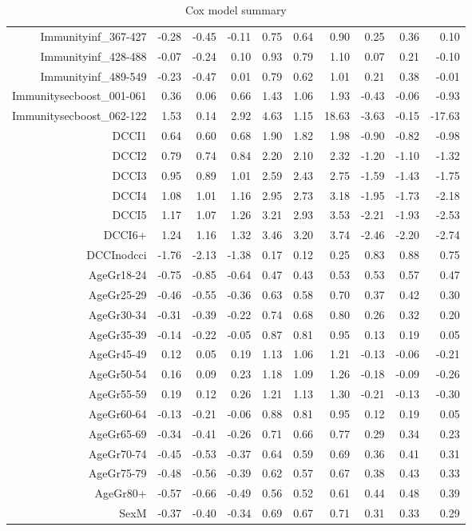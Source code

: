 \begin{table}[ht]
\begin{tabular}{rrrrrrrrrr}
  Immunityinf\_367-427 & -0.28 & -0.45 & -0.11 & 0.75 & 0.64 & 0.90 & 0.25 & 0.36 & 0.10 \\ 
  Immunityinf\_428-488 & -0.07 & -0.24 & 0.10 & 0.93 & 0.79 & 1.10 & 0.07 & 0.21 & -0.10 \\ 
  Immunityinf\_489-549 & -0.23 & -0.47 & 0.01 & 0.79 & 0.62 & 1.01 & 0.21 & 0.38 & -0.01 \\ 
  Immunitysecboost\_001-061 & 0.36 & 0.06 & 0.66 & 1.43 & 1.06 & 1.93 & -0.43 & -0.06 & -0.93 \\ 
  Immunitysecboost\_062-122 & 1.53 & 0.14 & 2.92 & 4.63 & 1.15 & 18.63 & -3.63 & -0.15 & -17.63 \\ 
  DCCI1 & 0.64 & 0.60 & 0.68 & 1.90 & 1.82 & 1.98 & -0.90 & -0.82 & -0.98 \\ 
  DCCI2 & 0.79 & 0.74 & 0.84 & 2.20 & 2.10 & 2.32 & -1.20 & -1.10 & -1.32 \\ 
  DCCI3 & 0.95 & 0.89 & 1.01 & 2.59 & 2.43 & 2.75 & -1.59 & -1.43 & -1.75 \\ 
  DCCI4 & 1.08 & 1.01 & 1.16 & 2.95 & 2.73 & 3.18 & -1.95 & -1.73 & -2.18 \\ 
  DCCI5 & 1.17 & 1.07 & 1.26 & 3.21 & 2.93 & 3.53 & -2.21 & -1.93 & -2.53 \\ 
  DCCI6+ & 1.24 & 1.16 & 1.32 & 3.46 & 3.20 & 3.74 & -2.46 & -2.20 & -2.74 \\ 
  DCCInodcci & -1.76 & -2.13 & -1.38 & 0.17 & 0.12 & 0.25 & 0.83 & 0.88 & 0.75 \\ 
  AgeGr18-24 & -0.75 & -0.85 & -0.64 & 0.47 & 0.43 & 0.53 & 0.53 & 0.57 & 0.47 \\ 
  AgeGr25-29 & -0.46 & -0.55 & -0.36 & 0.63 & 0.58 & 0.70 & 0.37 & 0.42 & 0.30 \\ 
  AgeGr30-34 & -0.31 & -0.39 & -0.22 & 0.74 & 0.68 & 0.80 & 0.26 & 0.32 & 0.20 \\ 
  AgeGr35-39 & -0.14 & -0.22 & -0.05 & 0.87 & 0.81 & 0.95 & 0.13 & 0.19 & 0.05 \\ 
  AgeGr45-49 & 0.12 & 0.05 & 0.19 & 1.13 & 1.06 & 1.21 & -0.13 & -0.06 & -0.21 \\ 
  AgeGr50-54 & 0.16 & 0.09 & 0.23 & 1.18 & 1.09 & 1.26 & -0.18 & -0.09 & -0.26 \\ 
  AgeGr55-59 & 0.19 & 0.12 & 0.26 & 1.21 & 1.13 & 1.30 & -0.21 & -0.13 & -0.30 \\ 
  AgeGr60-64 & -0.13 & -0.21 & -0.06 & 0.88 & 0.81 & 0.95 & 0.12 & 0.19 & 0.05 \\ 
  AgeGr65-69 & -0.34 & -0.41 & -0.26 & 0.71 & 0.66 & 0.77 & 0.29 & 0.34 & 0.23 \\ 
  AgeGr70-74 & -0.45 & -0.53 & -0.37 & 0.64 & 0.59 & 0.69 & 0.36 & 0.41 & 0.31 \\ 
  AgeGr75-79 & -0.48 & -0.56 & -0.39 & 0.62 & 0.57 & 0.67 & 0.38 & 0.43 & 0.33 \\ 
  AgeGr80+ & -0.57 & -0.66 & -0.49 & 0.56 & 0.52 & 0.61 & 0.44 & 0.48 & 0.39 \\ 
  SexM & -0.37 & -0.40 & -0.34 & 0.69 & 0.67 & 0.71 & 0.31 & 0.33 & 0.29 \\ 
   \hline
\end{tabular}
\caption{Cox model summary} 
\end{table}
